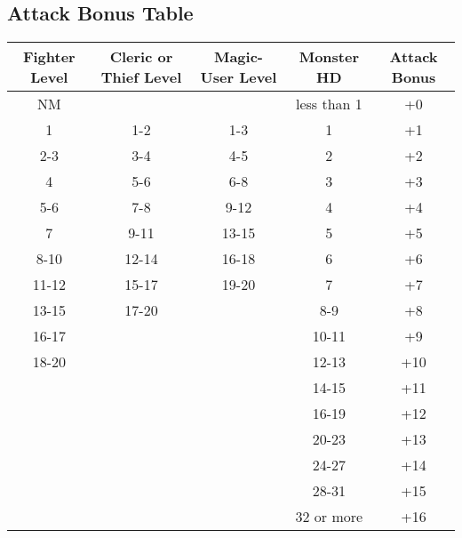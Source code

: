 \documentclass[a4paper,twoside,openany,10pt]{book}
\begin{document}
\subsection{Attack Bonus Table}
\begin{tabular*}{1\linewidth}{@{\extracolsep{\fill}}ccccc}
\textbf{Fighter Level} & \textbf{Cleric or Thief Level} & \textbf{Magic-User Level} & \textbf{Monster HD}& \textbf{Attack Bonus}\\\toprule
NM & & & less than 1 & +0\\\hline
1		& 1-2 &	1-3	 & 1	& +1\\\hline
2-3		& 3-4 & 4-5  & 2 & +2\\\hline
4		& 5-6 & 6-8  & 3 & +3\\\hline
5-6		& 7-8 & 9-12 & 4 & +4\\\hline
7		& 9-11& 13-15& 5 & +5\\\hline
8-10	& 12-14&16-18& 6 & +6\\\hline
11-12	& 15-17&19-20& 7 & +7\\\hline
13-15	& 17-20&	 &8-9& +8\\\hline
16-17	&		&	& 10-11&+9\\\hline			
18-20	&		&	& 12-13&+10\\\hline
		&		&	& 14-15&+11\\\hline
		&		&	& 16-19&+12\\\hline
		&		&	& 20-23&+13\\\hline
		&		&	& 24-27&+14\\\hline
		&		&	& 28-31&+15\\\hline
		&		&	& 32 or more&+16\\\bottomrule
\end{tabular*}
\end{document}

